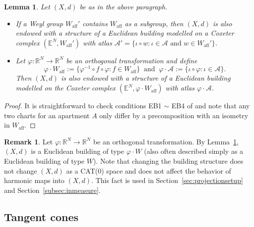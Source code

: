 \documentclass[12pt]{amsart}
\newtheorem{lemma}[theorem]{Lemma}
\theoremstyle{definition}
\newtheorem{remark}[theorem]{Remark}
\numberwithin{equation}{section}
\newcommand{\R}{\mathbb R}
\begin{document}
\begin{lemma} \label{biggeraffinegp}
Let $(X,d)$ be as in the above paragraph.  
\begin{itemize}
\item If a Weyl group $W_{\mathrm{aff}}'$ contains $W_{\mathrm{aff}}$ as a subgroup, then  $(X,d)$ is  also endowed with a structure of a Euclidean building  modelled  on a Coxeter complex $(\mathbb E^N, W_{\mathrm{aff}}')$ with atlas $\mathcal A'=\{\iota \circ w:  \iota \in \mathcal A \mbox{ and } w \in W_{\mathrm{aff}}'\}$.
\item Let $\varphi:\R^N \rightarrow \R^N$ be an orthogonal transformation and define $$
\varphi \cdot W_{\mathrm{aff}} := \{\varphi^{-1} \circ f \circ \varphi:  f \in W_{\mathrm{aff}} \} \ 
\mbox{ and } 
\ \varphi \cdot \mathcal A:= \{\iota \circ \varphi:  \iota \in \mathcal A\}.
$$ 
Then $(X,d)$ is also endowed with a structure of a Euclidean building modelled on the Coxeter complex $(\mathbb E^N, \varphi \cdot W_{\mathrm{aff}})$ with atlas $\varphi \cdot \mathcal A$.
\end{itemize}
\end{lemma}

\begin{proof}
It is straightforward to check conditions EB1 $\sim$ EB4 of \cite[Section 4.1.2]{kleiner-leeb} and note that any two charts  for an apartment $A$ only differ by a precomposition with an isometry in $W_{\mathrm{aff}}$. 
\end{proof}



\begin{remark} \label{rem:varphiW}
 Let $\varphi:\R^N \rightarrow \R^N$ be an orthogonal transformation.
By Lemma~\ref{biggeraffinegp}, $(X,d)$ is a Euclidean building of type $\varphi \cdot W$ 
(also often described simply as a Euclidean building of type $W$).  
Note that  changing the building structure does not change $(X,d)$ as a CAT(0) space and does not affect the behavior of harmonic maps into $(X,d)$.  This fact is used in Section~\ref{sec:projectionsetup} and Section~\ref{subsec:inmeasure}.
\end{remark}



\subsection{Tangent cones} \label{sec:tangentcone}
\end{document}

